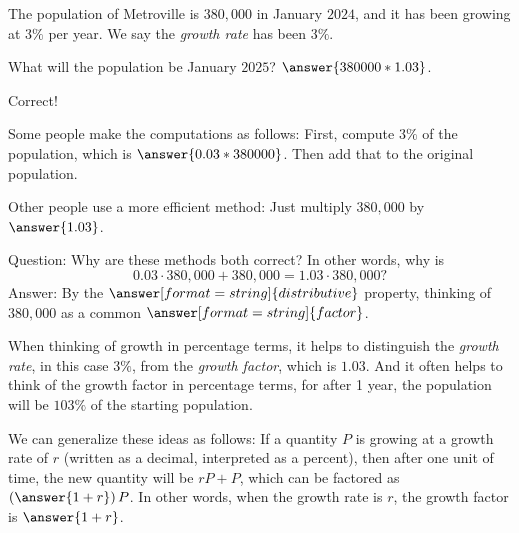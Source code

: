 \documentclass[nooutcomes]{ximera}
\begin{document}
\begin{problem}
The population of Metroville is $380,\!000$ in January $2024$, and it has been growing at $3\%$ per year.  We say the \emph{growth rate} has been $3\%$.  

What will the population be January $2025$?  $\answer{380000*1.03}$.  
\begin{problem}
Correct!  

Some people make the computations as follows:  First, compute $3\%$ of the population, which is $\answer{0.03*380000}$.  Then add that to the original population.  

Other people use a more efficient method:  Just multiply $380,\!000$ by $\answer{1.03}$.  

\begin{problem}
Question: Why are these methods both correct?  In other words, why is  
\[
0.03\cdot 380,\!000 + 380,\!000 = 1.03 \cdot 380,\!000?  
\]
Answer: By the $\answer[format=string]{distributive}$ property, thinking of $380,\!000$ as a common $\answer[format=string]{factor}$. 

\begin{problem}
When thinking of growth in percentage terms, it helps to distinguish the \emph{growth rate}, in this case $3\%$, from the 
\emph{growth factor}, which is $1.03$.  And it often helps to think of the growth factor in percentage terms, for after 1 year, 
the population will be $103\%$ of the starting population.  

We can generalize these ideas as follows:  If a quantity $P$ is growing at a growth rate of $r$ (written as a decimal, interpreted as a percent), then after one unit of time, the 
new quantity will be $rP + P$, which can be factored as $\left(\answer{1+r}\right)P$.  In other words, when the growth rate is $r$, the growth factor is $\answer{1+r}$.  

\end{problem}
\end{problem}
\end{problem}
\end{problem}
\end{document}
